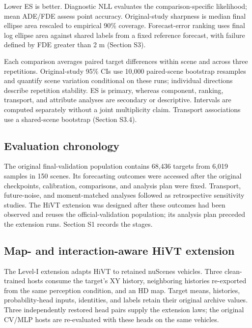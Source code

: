 \documentclass[lettersize,journal]{IEEEtran}
\begin{document}
Lower ES is better. Diagnostic NLL evaluates the comparison-specific likelihood; mean ADE/FDE assess point accuracy. Original-study sharpness is median final ellipse area rescaled to empirical 90\% coverage. Forecast-error ranking uses final log ellipse area against shared labels from a fixed reference forecast, with failure defined by FDE greater than 2 m (Section S3).

Each comparison averages paired target differences within scene and across three repetitions. Original-study 95\% CIs use 10,000 paired-scene bootstrap resamples and quantify scene variation conditional on these runs; individual directions describe repetition stability. ES is primary, whereas component, ranking, transport, and attribute analyses are secondary or descriptive. Intervals are computed separately without a joint multiplicity claim. Transport associations use a shared-scene bootstrap (Section S3.4).

\subsection{Evaluation chronology}
\label{subsec:section4-6}

The original final-validation population contains 68,436 targets from 6,019 samples in 150 scenes. Its forecasting outcomes were accessed after the original checkpoints, calibration, comparisons, and analysis plan were fixed. Transport, future-noise, and moment-matched analyses followed as retrospective sensitivity studies. The HiVT extension was designed after these outcomes had been observed and reuses the official-validation population; its analysis plan preceded the extension runs. Section S1 records the stages.

\subsection{Map- and interaction-aware HiVT extension}
\label{subsec:section4-7}

The Level-I extension adapts HiVT \cite{ref23} to retained nuScenes vehicles. Three clean-trained hosts consume the target's XY history, neighboring histories re-exported from the same perception condition, and an HD map. Target means, histories, probability-head inputs, identities, and labels retain their original archive values. Three independently restored head pairs supply the extension laws; the original CV/MLP hosts are re-evaluated with these heads on the same vehicles.
\end{document}
